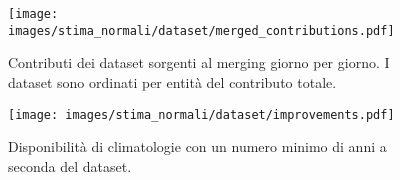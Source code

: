 \begin{figure}[ht]
  \centering
  \texttt{[image: images/stima\_normali/dataset/merged\_contributions.pdf]}
  \caption{Contributi dei dataset sorgenti al merging giorno per giorno. I dataset sono ordinati per entità del contributo totale.}\label{fig:merged-contributions}
\end{figure}

\begin{figure}[ht]
  \centering
  \texttt{[image: images/stima\_normali/dataset/improvements.pdf]}
  \caption{Disponibilità di climatologie con un numero minimo di anni a seconda del dataset.}\label{fig:merged-improvements}
\end{figure}